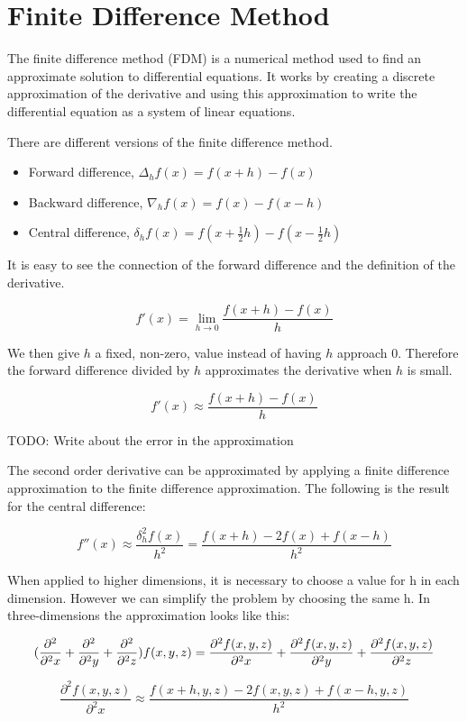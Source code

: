 \section{Finite Difference Method}

The finite difference method (FDM) is a numerical method used to find an approximate 
solution to differential equations. It works by creating a discrete approximation 
of the derivative and using this approximation to write the differential equation 
as a system of linear equations.

There are different versions of the finite difference method.
\begin{itemize}
	\item Forward difference, $\Delta_hf(x) = f(x+h) - f(x)$
	\item Backward difference, $\nabla_hf(x) = f(x) - f(x - h)$
	\item Central difference, $\delta_hf(x) = f(x + \frac{1}{2}h) - f(x - \frac{1}{2}h)$
\end{itemize}

It is easy to see the connection of the forward difference and the definition of 
the derivative.

$$f'(x) = \lim_{h \to 0} \frac{f(x+h) - f(x)}{h}$$

We then give $h$ a fixed, non-zero, value instead of having $h$ approach 0. Therefore 
the forward difference divided by $h$ approximates the derivative when $h$ is small.

$$f'(x) \approx \frac{f(x+h) - f(x)}{h}$$

TODO: Write about the error in the approximation

The second order derivative can be approximated by applying a finite difference 
approximation to the finite difference approximation. The following is the result 
for the central difference:

$$f''(x) \approx \frac{\delta_h^2f(x)}{h^2} = \frac{f(x+h) - 2f(x) + f(x-h)}{h^2}$$

When applied to higher dimensions, it is necessary to choose a value for h in each dimension. However we can simplify the problem by choosing the same h. In three-dimensions the approximation looks like this:

$$(\frac{\partial^2}{\partial^2 x} + \frac{\partial^2}{\partial^2 y} + \frac{\partial^2}{\partial^2 z}) f (x, y, z) = \frac{\partial^2 f(x, y, z)}{\partial^2 x} 
+ \frac{\partial^2 f(x, y, z)}{\partial^2 y} + \frac{\partial^2 f(x, y, z)}{\partial^2 z}$$

$$\frac{\partial^2 f(x, y, z)}{\partial^2 x} \approx \frac{f(x+h, y, z) - 2f(x, y, z) + f(x-h, y, z)}{h^2}$$

